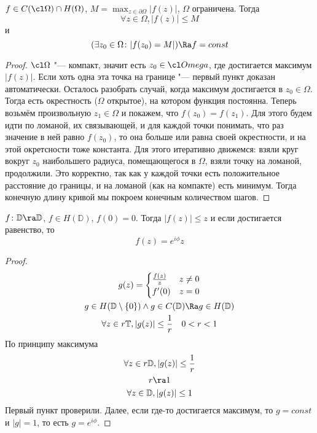 \begin{conseq}
	$f \in C(\cl \Omega) \cap H(\Omega)$, $M = \max_{z \in \partial \Omega} |f(z)|$, $\Omega$ ограничена.
	Тогда
	\[ \forall z \in \Omega, |f(z)| \le M \]
	и
	\[ (\exists z_0 \in \Omega \colon |f(z_0) = M|) \Ra f = const \]
\end{conseq}
\begin{proof}
	$\cl \Omega$ "--- компакт, значит есть $z_0 \in \cl Omega$, где достигается максимум $|f(z)|$.
	Если хоть одна эта точка на границе "--- первый пункт доказан автоматически.
	Осталось разобрать случай, когда максимум достигается в $z_0 \in \Omega$.
	Тогда есть окрестность ($\Omega$ открытое), на котором функция постоянна.
	Теперь возьмём произвольную $z_1 \in \Omega$ и покажем, что $f(z_0) = f(z_1)$.
	Для этого будем идти по ломаной, их связывающей, и для каждой точки понимать, что раз значение в ней равно $f(z_0)$,
	то она больше или равна своей окрестности, и на этой окретсности тоже константа.
	Для этого итеративно движемся: взяли круг вокруг $z_0$ наибольшего радиуса, помещающегося в $\Omega$, взяли точку на ломаной, продолжили.
	Это корректно, так как у каждой точки есть положительное расстояние до границы, и на ломаной (как на компакте) есть минимум.
	Тогда конечную длину кривой мы покроем конечным количеством шагов.
\end{proof}

\begin{lemma}[Шварца]
	$f\colon \mathbb D \ra \mathbb D$, $f \in H(\mathbb D)$, $f(0) = 0$.
	Тогда $|f(z)| \le z$ и если достигается равенство, то
	\[ f(z) = e^{i\phi}z \]
\end{lemma}
\begin{proof}
	\begin{gather*}
		g(z) = \begin{cases} \frac{f(z)}z & z \ne 0 \\ f'(0) & z = 0 \end{cases} \\
		g \in H(\mathbb D \setminus \{0\}) \land g \in C(\mathbb D) \Ra g \in H(\mathbb D) \\
		\forall z \in r\mathbb T, |g(z)| \le \frac1r \quad 0 < r < 1
	\end{gather*}
	По принципу максимума
	\begin{gather*}
		\forall z \in r\mathbb D, |g(z)| \le \frac1r \\
		r \ra 1 \\
		\forall z \in \mathbb D, |g(z)| \le 1
	\end{gather*}
	Первый пункт проверили.
	Далее, если где-то достигается максимум, то $g = const$ и $|g| = 1$, то есть $g=e^{i\phi}$.
\end{proof}
